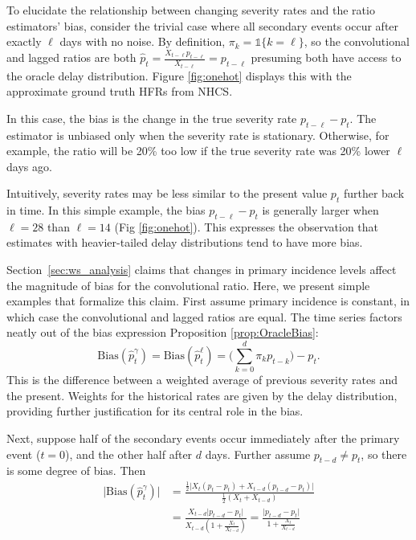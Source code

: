 \documentclass{article}
\renewcommand{\hat}{\widehat} %
\begin{document}
To elucidate the relationship between changing severity rates and the ratio estimators' bias, consider the trivial case where all secondary events occur after exactly $\ell$ days with no noise. By definition, $\pi_k = \mathds{1}\{k=\ell\}$, so the convolutional and lagged ratios are both $\hat{p}_t = \frac{X_{t-\ell}p_{t-\ell}}{X_{t-\ell}} = p_{t-\ell}$ presuming both have access to the oracle delay distribution. Figure \ref{fig:onehot} displays this with the approximate ground truth HFRs from NHCS. 

In this case, the bias is the change in the true severity rate $p_{t-\ell} - p_t$. The estimator is unbiased only when the severity rate is stationary. Otherwise, for example, the ratio will be 20\% too low if the true severity rate was 20\% lower $\ell$ days ago. 

Intuitively, severity rates may be less similar to the present value $p_t$ further back in time. In this simple example, the bias $p_{t-\ell}-p_t$ is generally larger when $\ell=28$ than $\ell=14$ (Fig \ref{fig:onehot}). This expresses the observation that estimates with heavier-tailed delay distributions tend to have more bias. 

Section~\ref{sec:ws_analysis} claims that changes in primary incidence levels affect the magnitude of bias for the convolutional ratio. Here, we present simple examples that formalize this claim. First assume primary incidence is constant, in which case the convolutional and lagged ratios are equal. The time series factors neatly out of the bias expression  Proposition \ref{prop:OracleBias}:
$$\text{Bias}(\hat{p}_t^{\gamma}) = \text{Bias}(\hat{p}_t^\ell) = \Big(\sum_{k=0}^d \pi_k p_{t-k}\Big)-p_t.$$
\noindent This is the difference between a weighted average of previous severity rates and the present. Weights for the historical rates are given by the delay distribution, providing further justification for its central role in the bias. 

Next, suppose half of the secondary events occur immediately after the primary event ($t=0$), and the other half after $d$ days. Further assume $p_{t-d}\neq p_t$, so there is some degree of bias. Then
\begin{align*}
    \lvert\text{Bias}(\hat{p}_t^{\gamma})\rvert &= \frac{\frac{1}{2}\big\lvert X_{t}(p_t-p_t) + X_{t-d}(p_{t-d}-p_t)\big\rvert}{\frac{1}{2}(X_{t}+X_{t-d})} \\
    &=\frac{X_{t-d}\lvert p_{t-d}-p_t\rvert}{X_{t-d}(1+\frac{X_{t}}{X_{t-d}})} = \frac{\lvert p_{t-d}-p_t \rvert}{1+\frac{X_{t}}{X_{t-d}}}
\end{align*}
\end{document}
